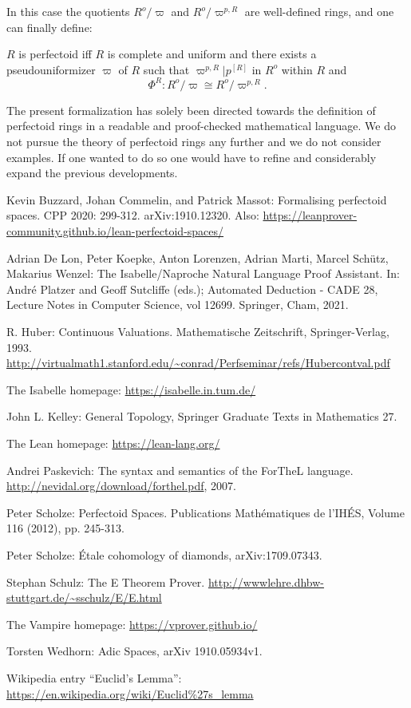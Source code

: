 \documentclass[11pt]{article}
\begin{document}
In this case the quotients $R^o/\varpi$ and $R^o/\varpi^{p,R}$ are well-defined
rings, and one can finally define:
\begin{forthel}
\begin{definition}
$R$ is perfectoid iff $R$ is complete and uniform and there
exists a pseudouniformizer $\varpi$ of $R$ such that    
$\varpi^{p,R} | p^{[R]}$ in $R^o$ within $R$
and 
$$\Phi^{R} : R^o / \varpi \cong R^o / \varpi^{p,R}.$$
\end{definition}

\end{forthel}

The present formalization has solely been directed towards 
the definition of perfectoid rings in a readable 
and proof-checked mathematical language. 
We do not pursue the theory of perfectoid rings any further
and we do not consider examples. If one wanted to do so one would 
have to refine and considerably expand the previous developments. 

\begin{thebibliography}{1}

Kevin Buzzard, Johan Commelin, and Patrick Massot:
Formalising perfectoid spaces. CPP 2020: 299-312. arXiv:1910.12320.
Also: 
\url{https://leanprover-community.github.io/lean-perfectoid-spaces/}

Adrian De Lon, Peter Koepke, Anton Lorenzen, Adrian Marti, Marcel Schütz, 
Makarius Wenzel: The Isabelle/Naproche Natural Language Proof Assistant.  
In: André Platzer and Geoff Sutcliffe (eds.); Automated Deduction - CADE 28, 
Lecture Notes in Computer Science, vol 12699. Springer, Cham, 2021.

R. Huber: Continuous Valuations. Mathematische Zeitschrift, Springer-Verlag, 1993.
\url{http://virtualmath1.stanford.edu/~conrad/Perfseminar/refs/Hubercontval.pdf}

The Isabelle homepage: \url{https://isabelle.in.tum.de/}

John L. Kelley: General Topology, Springer Graduate
Texts in Mathematics 27.


The Lean homepage: \url{https://lean-lang.org/}

Andrei Paskevich: The syntax and semantics of the ForTheL language.
\url{http://nevidal.org/download/forthel.pdf}, 2007.

 Peter Scholze: Perfectoid Spaces.
Publications Mathématiques de l'IHÉS, Volume 116 (2012), pp. 245-313. 

Peter Scholze: Étale cohomology of diamonds, arXiv:1709.07343.

Stephan Schulz: The E Theorem Prover. 
\url{http://wwwlehre.dhbw-stuttgart.de/~sschulz/E/E.html}

The Vampire homepage: \url{https://vprover.github.io/}

Torsten Wedhorn: Adic Spaces, arXiv 1910.05934v1.

Wikipedia entry ``Euclid's Lemma'': \url{https://en.wikipedia.org/wiki/Euclid\%27s_lemma}

\end{thebibliography}
\end{document}
